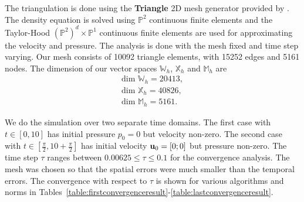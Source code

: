 \documentclass[letterpaper]{erdc}
\begin{document}
The triangulation is done using the \textbf{Triangle} 2D mesh generator
provided by \cite{shewchuk1996triangle}.  The density equation is solved using
$\mathbb{P}^2$ continuous finite elements and the Taylor-Hood
$\left(\mathbb{P}^2\right)^d\times \mathbb{P}^1$ continuous finite elements are
used for approximating the velocity and pressure.  The analysis is done with
the mesh fixed and time step varying.  Our mesh consists of 10092 triangle
elements, with 15252 edges and 5161 nodes.  The dimension of our vector spaces
$\mathbb{W}_h$, $\mathbb{X}_h$ and $\mathbb{M}_h$ are
\begin{align}
  \mbox{dim }\mathbb{W}_h = 20413,\\
  \mbox{dim }\mathbb{X}_h = 40826,\\
  \mbox{dim }\mathbb{M}_h = 5161.
\end{align}

We do the simulation over two separate time domains.  The first case with
$t\in[0,10]$ has initial pressure $p_0 = 0$ but velocity non-zero.  The second
case with $t\in\left[\frac{\pi}{2}, 10+\frac{\pi}{2} \right]$ has initial
velocity $\textbf{u}_0 = [0; 0]$ but pressure non-zero.  The time step $\tau$ ranges
between $0.00625\leq \tau \leq 0.1$ for the convergence analysis.  The mesh was
chosen so that the spatial errors were much smaller than the temporal errors.
The convergence with respect to $\tau$ is shown for various algorithms and
norms in
Tables~\ref{table:firstconvergenceresult}-\ref{table:lastconvergenceresult}.


\newpage


%
%
\end{document}
